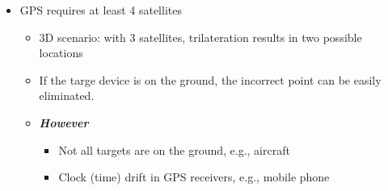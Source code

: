 \documentclass[10pt,landscape]{article}
\newcommand{\1}{\mathmybb{1}}
\begin{document}
\begin{multicols*}{3}
\begin{itemize}
\begin{enumerate}
\begin{itemize}
    \end{itemize}
  \end{enumerate}
  \item GPS requires at least 4 satellites
  \begin{itemize}
    \item 3D scenario: with 3 satellites, trilateration results in two possible locations
    \item If the targe device is on the ground, the incorrect point can be easily eliminated.
    \item \textbf{\textit{However}}
    \begin{itemize}
      \item Not all targets are on the ground, e.g., aircraft
      \item Clock (time) drift in GPS receivers, e.g., mobile phone
    \end{itemize}
  \end{itemize}
\end{itemize}


\end{multicols*}
\end{document}
